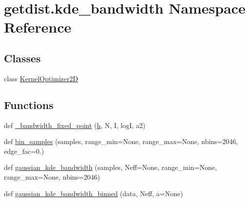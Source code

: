 \hypertarget{namespacegetdist_1_1kde__bandwidth}{}\section{getdist.\+kde\+\_\+bandwidth Namespace Reference}
\label{namespacegetdist_1_1kde__bandwidth}
\subsection*{Classes}
\begin{DoxyCompactItemize}
\item 
class \mbox{\hyperlink{classgetdist_1_1kde__bandwidth_1_1KernelOptimizer2D}{Kernel\+Optimizer2D}}
\end{DoxyCompactItemize}
\subsection*{Functions}
\begin{DoxyCompactItemize}
\item 
def \mbox{\hyperlink{namespacegetdist_1_1kde__bandwidth_a17c5a5d4b6eef8e7aad98a74bc775377}{\+\_\+bandwidth\+\_\+fixed\+\_\+point}} (\mbox{\hyperlink{plotTT_8m_aed4baa87751a8ac3167e69443cdc6241}{h}}, N, I, logI, a2)
\item 
def \mbox{\hyperlink{namespacegetdist_1_1kde__bandwidth_a1df6244e0384511be832a00924a1aabb}{bin\+\_\+samples}} (samples, range\+\_\+min=None, range\+\_\+max=None, nbins=2046, edge\+\_\+fac=0.)
\item 
def \mbox{\hyperlink{namespacegetdist_1_1kde__bandwidth_a263039d35460dd02a02948f52351bd52}{gaussian\+\_\+kde\+\_\+bandwidth}} (samples, Neff=None, range\+\_\+min=None, range\+\_\+max=None, nbins=2046)
\item 
def \mbox{\hyperlink{namespacegetdist_1_1kde__bandwidth_a87c7248527d8c44ff87753be76949fde}{gaussian\+\_\+kde\+\_\+bandwidth\+\_\+binned}} (data, Neff, a=None)
\end{DoxyCompactItemize}

